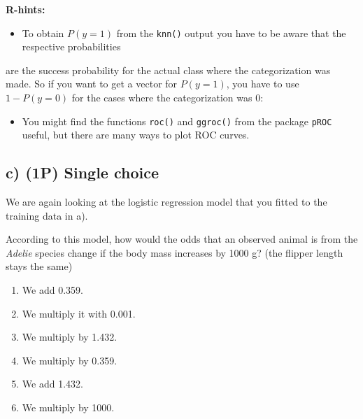 \documentclass[
]{article}
\newenvironment{Shaded}{\begin{snugshade}}{\end{snugshade}}
\newcommand{\DecValTok}[1]{\textcolor[rgb]{0.00,0.00,0.81}{#1}}
\newcommand{\FunctionTok}[1]{\textcolor[rgb]{0.00,0.00,0.00}{#1}}
\newcommand{\NormalTok}[1]{#1}
\newcommand{\OtherTok}[1]{\textcolor[rgb]{0.56,0.35,0.01}{#1}}
\newcommand{\SpecialCharTok}[1]{\textcolor[rgb]{0.00,0.00,0.00}{#1}}
\providecommand{\tightlist}{%
  \setlength{\itemsep}{0pt}\setlength{\parskip}{0pt}}
\begin{document}
\textbf{R-hints:}

\begin{itemize}
\tightlist
\item
  To obtain \(P(y=1)\) from the \texttt{knn()} output you have to be
  aware that the respective probabilities
\end{itemize}

\begin{Shaded}
\end{Shaded}

are the success probability for the actual class where the
categorization was made. So if you want to get a vector for \(P(y=1)\),
you have to use \(1-P(y=0)\) for the cases where the categorization was
0:

\begin{Shaded}
\end{Shaded}

\begin{itemize}
\tightlist
\item
  You might find the functions \texttt{roc()} and \texttt{ggroc()} from
  the package \texttt{pROC} useful, but there are many ways to plot ROC
  curves.
\end{itemize}

\hypertarget{c-1p-single-choice}{%
\subsection{c) (1P) Single choice}\label{c-1p-single-choice}}

We are again looking at the logistic regression model that you fitted to
the training data in a).

According to this model, how would the odds that an observed animal is
from the \emph{Adelie} species change if the body mass increases by 1000
g? (the flipper length stays the same)

\begin{enumerate}
\def\labelenumi{\roman{enumi})}
\tightlist
\item
  We add 0.359.
\item
  We multiply it with 0.001.
\item
  We multiply by 1.432.
\item
  We multiply by 0.359.
\item
  We add 1.432.
\item
  We multiply by 1000.
\end{enumerate}
\end{document}
